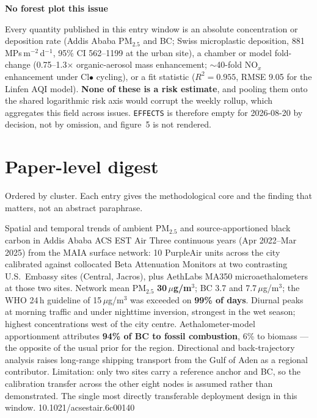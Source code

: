 \documentclass[10pt]{article}
\begin{document}
\vspace{2mm}
\begin{keybox}
{\sffamily\bfseries\footnotesize\color{Deep}No forest plot this issue}\\[1.2mm]
{\fontsize{7.2}{8.8}\selectfont
Every quantity published in this entry window is an absolute concentration or deposition
rate (Addis Ababa PM$_{2.5}$ and BC; Swiss microplastic deposition, 881
MPs\,m$^{-2}$\,d$^{-1}$, 95\% CI 562--1199 at the urban site), a chamber or model
fold-change (0.75--1.3$\times$ organic-aerosol mass enhancement; $\sim$40-fold NO$_x$
enhancement under Cl$\bullet$ cycling), or a fit statistic ($R^2=0.955$, RMSE 9.05 for the
Linfen AQI model). \textbf{None of these is a risk estimate}, and pooling them onto the
shared logarithmic risk axis would corrupt the weekly rollup, which aggregates this
field across issues. \texttt{EFFECTS} is therefore empty for 2026-08-20 by decision, not
by omission, and figure~5 is not rendered.\par}
\end{keybox}

\clearpage

\section*{\sffamily\bfseries\color{Deep}Paper-level digest}
\vspace{-1.5mm}{\color{Amber}\rule{\linewidth}{1.1pt}}\vspace{1mm}

{\fontsize{7.4}{9}\selectfont\color{Slate}Ordered by cluster. Each entry gives the
methodological core and the finding that matters, not an abstract paraphrase.\par}


{Spatial and temporal trends of ambient PM$_{2.5}$ and source-apportioned black carbon in Addis Ababa}
{ACS EST Air}
{Three continuous years (Apr 2022--Mar 2025) from the MAIA surface network: 10 PurpleAir
units across the city calibrated against collocated Beta Attenuation Monitors at two
contrasting U.S.\ Embassy sites (Central, Jacros), plus AethLabs MA350 microaethalometers
at those two sites. Network mean PM$_{2.5}$ \textbf{30\,$\mu$g/m$^3$}; BC 3.7 and
7.7\,$\mu$g/m$^3$; the WHO 24\,h guideline of 15\,$\mu$g/m$^3$ was exceeded on
\textbf{99\% of days}. Diurnal peaks at morning traffic and under nighttime inversion,
strongest in the wet season; highest concentrations west of the city centre.
Aethalometer-model apportionment attributes \textbf{94\% of BC to fossil combustion},
6\% to biomass --- the opposite of the usual prior for the region. Directional and
back-trajectory analysis raises long-range shipping transport from the Gulf of Aden as a
regional contributor. Limitation: only two sites carry a reference anchor and BC, so the
calibration transfer across the other eight nodes is assumed rather than demonstrated.
The single most directly transferable deployment design in this window.}
{10.1021/acsestair.6c00140}
\end{document}
